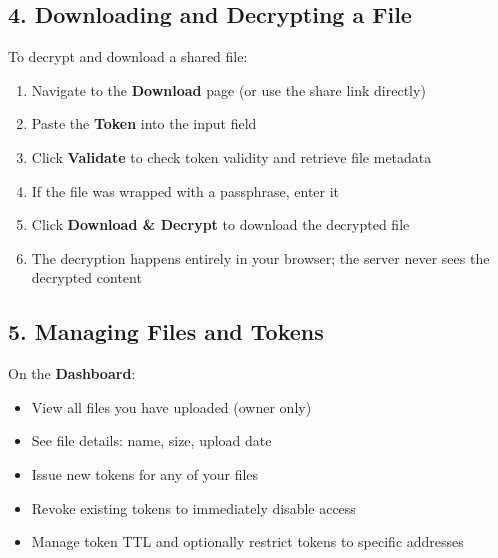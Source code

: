 \subsection*{4. Downloading and Decrypting a File}
To decrypt and download a shared file:
\begin{enumerate}
  \item Navigate to the \textbf{Download} page (or use the share link directly)
  \item Paste the \textbf{Token} into the input field
  \item Click \textbf{Validate} to check token validity and retrieve file metadata
  \item If the file was wrapped with a passphrase, enter it
  \item Click \textbf{Download \& Decrypt} to download the decrypted file
  \item The decryption happens entirely in your browser; the server never sees the decrypted content
\end{enumerate}

\subsection*{5. Managing Files and Tokens}
On the \textbf{Dashboard}:
\begin{itemize}
  \item View all files you have uploaded (owner only)
  \item See file details: name, size, upload date
  \item Issue new tokens for any of your files
  \item Revoke existing tokens to immediately disable access
  \item Manage token TTL and optionally restrict tokens to specific addresses
\end{itemize}

